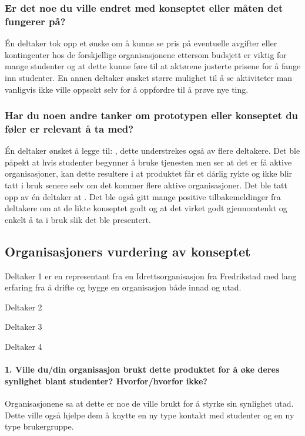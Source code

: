 \subsubsection{Er det noe du ville endret med konseptet eller måten det fungerer på?}
Én deltaker tok opp et ønske om å kunne se pris på eventuelle avgifter eller kontingenter hos de forskjellige organisasjonene ettersom budsjett er viktig for mange studenter og at dette kunne føre til at aktørene justerte prisene for å fange inn studenter. En annen deltaker ønsket større mulighet til å se aktiviteter man vanligvis ikke ville oppsøkt selv for å oppfordre til å prøve nye ting.

\subsubsection{Har du noen andre tanker om prototypen eller konseptet du føler er relevant å ta med?}
Én deltaker ønsket å legge til: , dette understrekes også av flere deltakere. Det ble påpekt at hvis studenter begynner å bruke tjenesten men ser at det er få aktive organisasjoner, kan dette resultere i at produktet får et dårlig rykte og ikke blir tatt i bruk senere selv om det kommer flere aktive organisasjoner. Det ble tatt opp av én deltaker at . Det ble også gitt mange positive tilbakemeldinger fra deltakere om at de likte konseptet godt og at det virket godt gjennomtenkt og enkelt å ta i bruk slik det ble presentert.


\subsection{Organisasjoners vurdering av konseptet}
Deltaker 1 er en representant fra en Idrettsorganisasjon fra Fredrikstad med lang erfaring fra å drifte og bygge en organisasjon både innad og utad.

Deltaker 2

Deltaker 3

Deltaker 4

\paragraph{1. Ville du/din organisasjon brukt dette produktet for å øke deres synlighet blant studenter? Hvorfor/hvorfor ikke?}
Organisasjonene sa at dette er noe de ville brukt for å styrke sin synlighet utad. Dette ville også hjelpe dem å knytte en ny type kontakt med studenter og en ny type brukergruppe.

